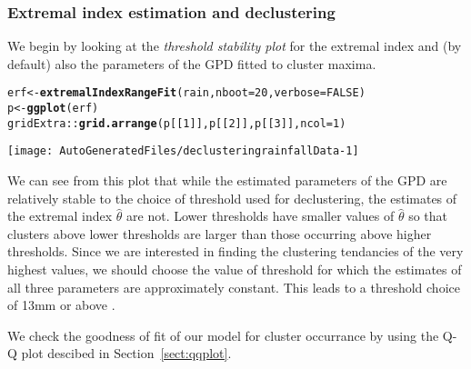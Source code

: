 \documentclass[10pt]{article}\usepackage[]{graphicx}\usepackage[]{color}
\makeatletter
\def\maxwidth{ %
  \ifdim\Gin@nat@width>\linewidth
    \linewidth
  \else
    \Gin@nat@width
  \fi
}
\newcommand{\hlnum}[1]{\textcolor[rgb]{0.686,0.059,0.569}{#1}}%
\newcommand{\hlopt}[1]{\textcolor[rgb]{0,0,0}{#1}}%
\newcommand{\hlstd}[1]{\textcolor[rgb]{0.345,0.345,0.345}{#1}}%
\newcommand{\hlkwb}[1]{\textcolor[rgb]{0.69,0.353,0.396}{#1}}%
\newcommand{\hlkwc}[1]{\textcolor[rgb]{0.333,0.667,0.333}{#1}}%
\newcommand{\hlkwd}[1]{\textcolor[rgb]{0.737,0.353,0.396}{\textbf{#1}}}%
\newenvironment{kframe}{%
 \def\at@end@of@kframe{}%
 \ifinner\ifhmode%
  \def\at@end@of@kframe{\end{minipage}}%
  \begin{minipage}{\columnwidth}%
 \fi\fi%
 \def\FrameCommand##1{\hskip\@totalleftmargin \hskip-\fboxsep
 \colorbox{shadecolor}{##1}\hskip-\fboxsep
     \hskip-\linewidth \hskip-\@totalleftmargin \hskip\columnwidth}%
 \MakeFramed {\advance\hsize-\width
   \@totalleftmargin\z@ \linewidth\hsize
   \@setminipage}}%
 {\par\unskip\endMakeFramed%
 \at@end@of@kframe}
\newenvironment{knitrout}{}{} %
\makeatother
\begin{document}
\subsubsection*{Extremal index estimation and declustering}

We begin by looking at the {\it threshold stability plot} for the extremal index and (by default) also the parameters of the GPD fitted to cluster maxima.

\begin{knitrout}
\color{fgcolor}\begin{kframe}
\begin{alltt}
\hlstd{erf} \hlkwb{<-} \hlkwd{extremalIndexRangeFit}\hlstd{(rain,}\hlkwc{nboot}\hlstd{=}\hlnum{20}\hlstd{,}\hlkwc{verbose}\hlstd{=}\hlnum{FALSE}\hlstd{)}
\hlstd{p} \hlkwb{<-} \hlkwd{ggplot}\hlstd{(erf)}
\hlstd{gridExtra}\hlopt{::}\hlkwd{grid.arrange}\hlstd{(p[[}\hlnum{1}\hlstd{]],p[[}\hlnum{2}\hlstd{]],p[[}\hlnum{3}\hlstd{]],}\hlkwc{ncol}\hlstd{=}\hlnum{1}\hlstd{)}
\end{alltt}
\end{kframe}
\texttt{[image: AutoGeneratedFiles/declusteringrainfallData-1]} 

\end{knitrout}

We can see from this plot that while the estimated parameters of the GPD are relatively stable to the choice of threshold used for declustering, the estimates of the extremal index $\hat\theta$ are not.  Lower thresholds have smaller values of $\hat\theta$ so that clusters above lower thresholds are larger than those occurring above higher thresholds.  Since we are interested in finding the clustering tendancies of the very highest values, we should choose the value of threshold for which the estimates of all three parameters are approximately constant.  This leads to a threshold choice of 13mm or above .

We check the goodness of fit of our model for cluster occurrance by using the Q-Q plot descibed in Section~\ref{sect:qqplot}.
\end{document}
